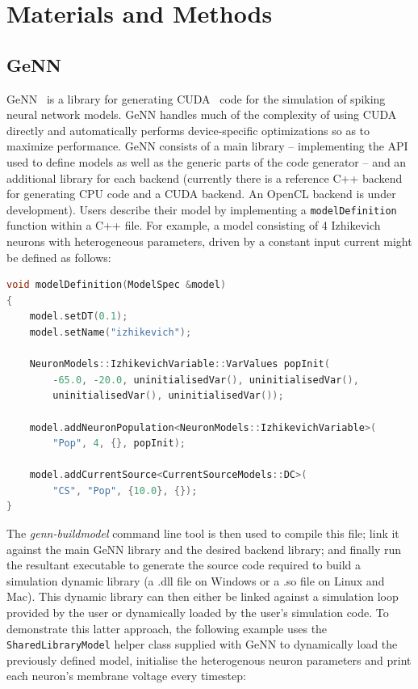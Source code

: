 \documentclass[utf8]{frontiersSCNS} %
\begin{document}
\section{Materials and Methods}
\subsection{GeNN}
\label{sec:methods/genn}
GeNN~\citep{Yavuz2016} is a library for generating CUDA~\citep{CUDA2020} code for the simulation of spiking neural network models.
GeNN handles much of the complexity of using CUDA directly and automatically performs device-specific optimizations so as to maximize performance.
GeNN consists of a main library -- implementing the API used to define models as well as the generic parts of the code generator -- and an additional library for each backend (currently there is a reference C++ backend for generating CPU code and a CUDA backend. An OpenCL backend is under development).
Users describe their model by implementing a \lstinline{modelDefinition} function within a C++ file. For example, a model consisting of 4 Izhikevich neurons with heterogeneous parameters, driven by a constant input current might be defined as follows:
%
\begin{lstlisting}[language=C++]
void modelDefinition(ModelSpec &model)
{
    model.setDT(0.1);
    model.setName("izhikevich");
    
    NeuronModels::IzhikevichVariable::VarValues popInit(
        -65.0, -20.0, uninitialisedVar(), uninitialisedVar(),
        uninitialisedVar(), uninitialisedVar());
    
    model.addNeuronPopulation<NeuronModels::IzhikevichVariable>(
        "Pop", 4, {}, popInit);

    model.addCurrentSource<CurrentSourceModels::DC>(
        "CS", "Pop", {10.0}, {});
}
\end{lstlisting}
%
The \emph{genn-buildmodel} command line tool is then used to compile this file; link it against the main GeNN library and the desired backend library; and finally run the resultant executable to generate the source code required to build a simulation dynamic library (a .dll file on Windows or a .so file on Linux and Mac).
This dynamic library can then either be linked against a simulation loop provided by the user or dynamically loaded by the user's simulation code.
To demonstrate this latter approach, the following example uses the \lstinline{SharedLibraryModel} helper class supplied with GeNN to dynamically load the previously defined model, initialise the heterogenous neuron parameters and print each neuron's membrane voltage every timestep: 
\end{document}
